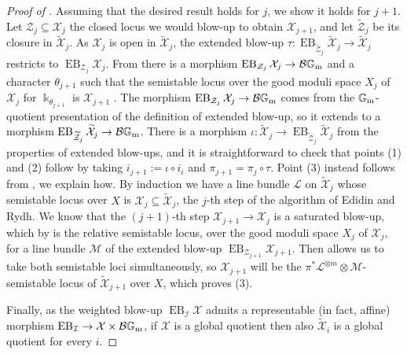 \documentclass{amsart}
\newcommand{\bG}{\mathbb{G}}
\newcommand{\cB}{\mathcal{B}}
\newcommand{\cI}{\mathcal{I}}
\newcommand{\cL}{\mathcal{L}}
\newcommand{\cM}{\mathcal{M}}
\newcommand{\cX}{\mathcal{X}}
\newcommand{\cZ}{\mathcal{Z}}
\newcommand{\Gm}{\bG_{{\rm m}}}
\DeclareMathOperator{\EB}{EB}
\theoremstyle{definition}
\theoremstyle{definition}
\begin{document}
{\begin{proof}[Proof of ]
Assuming that the desired result holds for $j$, we show it holds for $j+1$. Let $\cZ_j\subseteq \cX_j$ the closed locus we would blow-up to obtain $\cX_{j+1}$, and let $\widetilde{\cZ}_j$ be its closure in $\widetilde{\cX}_j$. As $\cX_j$ is open in $\widetilde{\cX}_j$, the extended blow-up $\tau:\EB_{\widetilde{\cZ}_j}\widetilde{\cX}_j\to \widetilde{\cX}_j$ restricts to $\EB_{\cZ_j}\cX_j$. From  there is a morphism $\EB_{\cZ_j}\cX_j\to \cB \Gm$ and a character $\theta_{j+1}$ such that the semistable locus over the good moduli space $X_j$ of $\cX_j$ for $\Bbbk_{\theta_{j+1}}$ is $\cX_{j+1}$ . The morphism $\EB_{\cZ_j}\cX_j\to \cB \Gm$ comes from the $\Gm$-quotient presentation of the definition of extended blow-up, so it extends to a morphism $\EB_{\widetilde{\cZ}_j}\widetilde{\cX}_j\to \cB \Gm$. There is a morphism $\iota:\widetilde{\cX}_j\to \EB_{\widetilde{\cZ}_j}\widetilde{\cX}_j$ from the properties of extended blow-ups, and it is straightforward to check that points (1) and (2) follow by taking $i_{j+1}:=\iota\circ i_i$ and $\pi_{j+1} = \pi_j\circ \tau$. Point (3) instead follows from , we explain how. By induction we have a line bundle $\cL$ on $\widetilde{\cX}_j$ whose semistable locus over $X$ is $\cX_j\subseteq \widetilde{\cX}_j$, the $j$-th step of the algorithm of Edidin and Rydh.
We know that the $(j+1)$-th
step $\cX_{j+1}\to \cX_j$ is a saturated blow-up, which by  is the relative semistable locus, over the good moduli space $X_j$ of $\cX_j$, for a line bundle $\cM$ of the extended blow-up $\EB_{\cZ_{j+1}}\cX_{j+1}$. Then  allows us to take both semistable loci simultaneously, so $\cX_{j+1}$ will be the $\pi^*\cL^{\otimes m}\otimes \cM$-semistable locus of $\widetilde{\cX}_{j+1}$ over $X$, which proves (3). 

Finally, as the weighted blow-up $\EB_\cI \cX$ admits a representable (in fact, affine) morphism $\EB_\cI\to \cX\times \cB \Gm$, if $\cX$ is a global quotient then also $\widetilde{\cX}_i$ is a global quotient for every $i$.
\end{proof}




}
\end{document}
